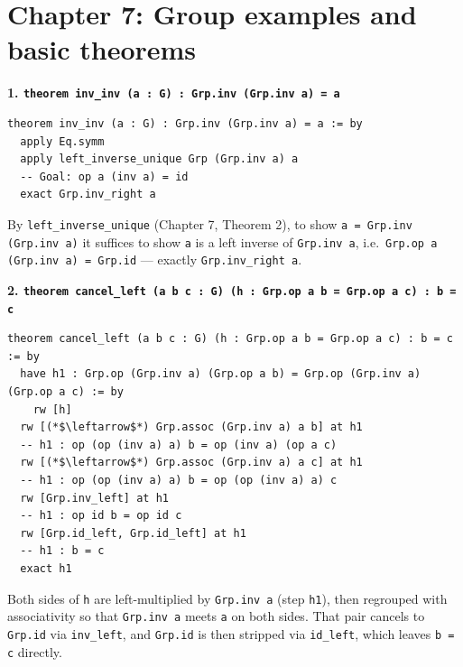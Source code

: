 \section{Chapter 7: Group examples and basic theorems}\label{sec:14-appendix-solutions:06-chapter-7:1}

\textbf{1. \texttt{theorem inv\_\allowbreak{}inv (a : G) : Grp.inv (Grp.inv a) = a}}

\begin{lstlisting}
theorem inv_inv (a : G) : Grp.inv (Grp.inv a) = a := by
  apply Eq.symm
  apply left_inverse_unique Grp (Grp.inv a) a
  -- Goal: op a (inv a) = id
  exact Grp.inv_right a
\end{lstlisting}

By \texttt{left\_\allowbreak{}inverse\_\allowbreak{}unique} (Chapter 7, Theorem 2), to show \texttt{a = Grp.inv (Grp.inv a)} it suffices to show \texttt{a} is a left inverse of \texttt{Grp.inv a}, i.e.~\texttt{Grp.op a (Grp.inv a) = Grp.id} --- exactly \texttt{Grp.inv\_\allowbreak{}right a}.

\textbf{2. \texttt{theorem cancel\_\allowbreak{}left (a b c : G) (h : Grp.op a b = Grp.op a c) : b = c}}

\begin{lstlisting}
theorem cancel_left (a b c : G) (h : Grp.op a b = Grp.op a c) : b = c := by
  have h1 : Grp.op (Grp.inv a) (Grp.op a b) = Grp.op (Grp.inv a) (Grp.op a c) := by
    rw [h]
  rw [(*$\leftarrow$*) Grp.assoc (Grp.inv a) a b] at h1
  -- h1 : op (op (inv a) a) b = op (inv a) (op a c)
  rw [(*$\leftarrow$*) Grp.assoc (Grp.inv a) a c] at h1
  -- h1 : op (op (inv a) a) b = op (op (inv a) a) c
  rw [Grp.inv_left] at h1
  -- h1 : op id b = op id c
  rw [Grp.id_left, Grp.id_left] at h1
  -- h1 : b = c
  exact h1
\end{lstlisting}

Both sides of \texttt{h} are left-multiplied by \texttt{Grp.inv a} (step \texttt{h1}), then regrouped with associativity so that \texttt{Grp.inv a} meets \texttt{a} on both sides. That pair cancels to \texttt{Grp.id} via \texttt{inv\_\allowbreak{}left}, and \texttt{Grp.id} is then stripped via \texttt{id\_\allowbreak{}left}, which leaves \texttt{b = c} directly.
